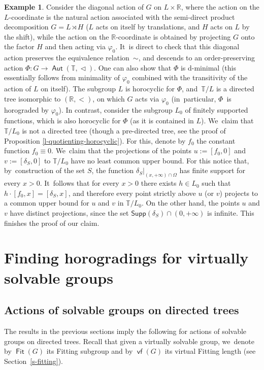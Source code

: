 \documentclass[JEP,XML,SOM,Unicode,NoFloatCountersInSection,published]{cedram}
\theoremstyle{definition}
\newtheorem{ex}[thm]{Example}
\DeclareMathOperator{\Aut}{\mathsf{Aut}}
\DeclareMathOperator{\Fit}{\mathsf{Fit}}
\DeclareMathOperator{\vf}{\mathsf{vf}}
\newcommand{\R}{\mathbb{R}}
\newcommand{\Tbb}{\mathbb T}
\newcommand{\treeorder}{\mathrel{\triangleleft}}
\begin{document}
\begin{ex}
Consider the diagonal action of $G$ on $L\times \R$, where the action on the ${L}$-coordinate is the natural action associated with the semi-direct product decomposition $G=L\rtimes H$ (\ie $L$ acts on itself by translations, and $H$ acts on $L$ by the shift), while the action on the $\R$-coordinate is obtained by projecting $G$ onto the factor $H$ and then acting via $\varphi_0$. It~is direct to check that this diagonal action preserves the equivalence relation~$\sim$, and descends to an order-preserving action $\Phi\colon G\to\Aut(\Tbb,\treeorder)$. One can also show that $\Phi$ is d-minimal (this essentially follows from minimality of $\varphi_0$ combined with the transitivity of the action of $L$ on itself). The subgroup ${L}$ is horocyclic for $\Phi$, and~$\Tbb/L$ is a directed tree isomorphic to $(\R, <)$, on which $G$ acts via $\varphi_0$ (in~particular, $\Phi$~is horograded by $\varphi_0$). In contrast, consider the subgroup $L_0$ of finitely supported functions, which is also horocyclic for $\Phi$ (as it is contained in $L$). We~claim that $\Tbb/L_0$ is not a directed tree (though a pre-directed tree, see the proof of Proposition \ref{l-quotienting-horocyclic}). For this, denote by $f_0$ the constant function $f_0\equiv 0$. We~claim that the projections of the points $u:=[f_0,0]$ and $v:=[\delta_S,0]$ to $\Tbb/L_0$ have no least common upper bound. For this notice that, by~construction of the set $S$, the function $\delta_S|_{(x, +\infty)\cap \Omega}$ has finite support for every $x>0$. It~follows that for every $x>0$ there exists $h\in L_0$ such that $h\cdot [f_0,x]=[\delta_S,x]$, and therefore every point strictly above $u$ (or $v$) projects to a common upper bound for $u$ and $v$ in $\Tbb/L_0$. On the other hand, the points $u$ and $v$ have distinct projections, since the set $\mathsf{Supp}(\delta_S)\cap(0,+\infty)$ is infinite. This finishes the proof of our claim.
\end{ex}

\section{Finding horogradings for virtually solvable groups}\label{s.Rfocal-solvable}
\label{sec Focal solvable}

\subsection{Actions of solvable groups on directed trees}

The results in the previous sections imply the following for actions of solvable groups on directed trees. Recall that given a virtually solvable group, we~denote by $\Fit(G)$ its Fitting subgroup and by $\vf(G)$ its virtual Fitting length (see Section~\ref{s-fitting}).
\end{document}
